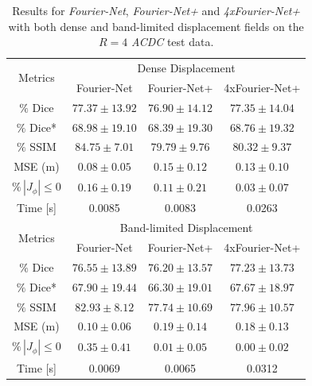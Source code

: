 \documentclass[english,version-2022-01]{uzl-thesis} %
\begin{document}
\begin{table}[h] %
	\centering
	\caption{Results for \emph{Fourier-Net}, \emph{Fourier-Net+} and \emph{4xFourier-Net+} with both dense and band-limited displacement fields on the $R=4$ \emph{ACDC} test data.}
	\label{tab:DenseDisplacementAcc4}
	\begin{tabular}{c c c c} %
		\toprule
		\multirow{2}{*}{Metrics} & \multicolumn{3}{c}{Dense Displacement} \\
		\cline{2-4} 
		 & Fourier-Net & Fourier-Net+ & 4xFourier-Net+\\	
		\midrule
		$\%$ Dice & $77.37 \pm 13.92$ & $76.90 \pm 14.12$ & $77.35 \pm 14.04$\\
		$\%$ Dice* & $68.98 \pm 19.10$ & $68.39 \pm 19.30$ & $68.76 \pm 19.32$ \\
		$\%$ SSIM & $84.75 \pm 7.01$ & $79.79 \pm 9.76$ & $80.32 \pm 9.37$\\
		MSE (m) & $0.08 \pm 0.05$ & $0.15 \pm 0.12$ & $0.13 \pm 0.10$ \\
		$\% \, |J_{\phi}|\leq0$ & $0.16 \pm 0.19$ & $0.11 \pm 0.21$ & $0.03 \pm 0.07$ \\
		Time [s] 	  & 0.0085 & 0.0083 & 0.0263  \\
		\midrule
		\multirow{2}{*}{Metrics} & \multicolumn{3}{c}{Band-limited Displacement} \\
		\cline{2-4} 
		 & Fourier-Net & Fourier-Net+ & 4xFourier-Net+\\		
		\midrule
		$\%$ Dice & $76.55 \pm 13.89$ & $76.20 \pm 13.57$ & $77.23 \pm 13.73$\\
		$\%$ Dice* & $67.90 \pm 19.44$ & $66.30 \pm 19.01$ & $67.67 \pm 18.97$ \\
		$\%$ SSIM & $82.93 \pm 8.12$ & $77.74 \pm 10.69$ & $77.96 \pm 10.57$\\
		MSE (m) & $0.10 \pm 0.06$ & $0.19 \pm 0.14$ & $0.18 \pm 0.13$ \\
		$\% \, |J_{\phi}|\leq0$ & $0.35 \pm 0.41$ & $0.01 \pm 0.05$ & $0.00 \pm 0.02$ \\
		Time [s] 	  & 0.0069  	& 0.0065 	& 0.0312  \\
		\bottomrule
	\end{tabular}	
\end{table}
\end{document}
